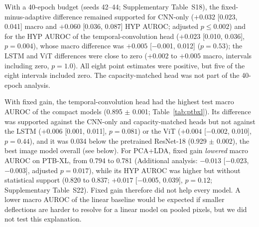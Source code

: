 \documentclass{wlscirep}
\begin{document}
With a 40-epoch budget (seeds 42--44; Supplementary Table~S18), the fixed-minus-adaptive difference remained supported for CNN-only ($+0.032$ [0.023, 0.041] macro and $+0.060$ [0.036, 0.087] HYP AUROC; adjusted $p\le0.002$) and for the HYP AUROC of the temporal-convolution head ($+0.023$ [0.010, 0.036], $p=0.004$), whose macro difference was $+0.005$ [$-$0.001, 0.012] ($p=0.53$); the LSTM and ViT differences were close to zero ($+0.002$ to $+0.005$ macro, intervals including zero, $p=1.0$). All eight point estimates were positive, but five of the eight intervals included zero. The capacity-matched head was not part of the 40-epoch analysis.

With fixed gain, the temporal-convolution head had the highest test macro AUROC of the compact models (0.895 $\pm$ 0.001; Table~\ref{tab:ptbxl}). Its difference was supported against the CNN-only and capacity-matched heads but not against the LSTM ($+0.006$ [0.001, 0.011], $p=0.081$) or the ViT ($+0.004$ [$-$0.002, 0.010], $p=0.44$), and it was 0.034 below the pretrained ResNet-18 (0.929 $\pm$ 0.002), the best image model overall (see below). For PCA+LDA, fixed gain \emph{lowered} macro AUROC on PTB-XL, from 0.794 to 0.781 (Additional analysis: $-0.013$ [$-$0.023, $-$0.003], adjusted $p=0.017$), while its HYP AUROC was higher but without statistical support (0.820 to 0.837; $+0.017$ [$-$0.005, 0.039], $p=0.12$; Supplementary Table~S22). Fixed gain therefore did not help every model. A lower macro AUROC of the linear baseline would be expected if smaller deflections are harder to resolve for a linear model on pooled pixels, but we did not test this explanation.
\end{document}
